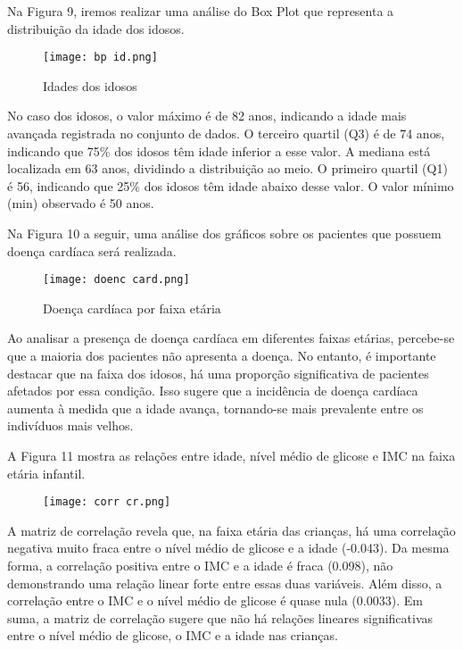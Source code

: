 \documentclass[conference]{IEEEtran}
\begin{document}
Na Figura 9, iremos realizar uma análise do Box Plot que representa a distribuição da idade dos idosos. 

\begin{figure}[h]
  \caption{Idades dos idosos}
  \centering
  \texttt{[image: bp id.png]}
\end{figure}

No caso dos idosos, o valor máximo é de 82 anos, indicando a idade mais avançada registrada no conjunto de dados. O terceiro quartil (Q3) é de 74 anos, indicando que 75$\%$ dos idosos têm idade inferior a esse valor. A mediana está localizada em 63 anos, dividindo a distribuição ao meio. O primeiro quartil (Q1) é 56, indicando que 25$\%$ dos idosos têm idade abaixo desse valor. O valor mínimo (min) observado é 50 anos. 

Na Figura 10 a seguir, uma análise dos gráficos sobre os pacientes que possuem doença cardíaca será realizada.

\begin{figure}[H]
   \caption{Doença cardíaca por faixa etária}
   \centering
   \texttt{[image: doenc card.png]}
\end{figure} 

Ao analisar a presença de doença cardíaca em diferentes faixas etárias, percebe-se que a maioria dos pacientes não apresenta a doença. No entanto, é importante destacar que na faixa dos idosos, há uma proporção significativa de pacientes afetados por essa condição. Isso sugere que a incidência de doença cardíaca aumenta à medida que a idade avança, tornando-se mais prevalente entre os indivíduos mais velhos. 

A Figura 11 mostra as relações entre idade, nível médio de glicose e IMC na faixa etária infantil. 

\begin{figure}[H]
   \caption{}
   \centering
   \texttt{[image: corr cr.png]}
\end{figure} 

A matriz de correlação revela que, na faixa etária das crianças, há uma correlação negativa muito fraca entre o nível médio de glicose e a idade (-0.043). Da mesma forma, a correlação positiva entre o IMC e a idade é fraca (0.098), não demonstrando uma relação linear forte entre essas duas variáveis. Além disso, a correlação entre o IMC e o nível médio de glicose é quase nula (0.0033). Em suma, a matriz de correlação sugere que não há relações lineares significativas entre o nível médio de glicose, o IMC e a idade nas crianças.
\end{document}

